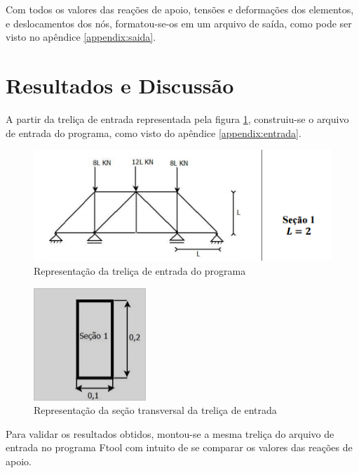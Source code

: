 \documentclass[paper=a4, fontsize=11pt]{scrartcl}
\begin{document}
Com todos os valores das reações de apoio, tensões e deformações dos elementos, e deslocamentos dos nós, formatou-se-os em um arquivo de saída, como pode ser visto no apêndice \ref{appendix:saida}.

\section{Resultados e Discussão}

A partir da treliça de entrada representada pela figura \ref{fig:trelica_entrada}, construiu-se o arquivo de entrada do programa, como visto do apêndice \ref{appendix:entrada}.

\begin{figure}[H]
  \includegraphics[width=\textwidth]{trelica_entrada.png}
  \caption{Representação da treliça de entrada do programa}
  \label{fig:trelica_entrada}
\end{figure}

\begin{figure}[H]
  \includegraphics[center]{secao1.png}
  \caption{Representação da seção transversal da treliça de entrada}
  \label{fig:secao14}
\end{figure}


Para validar os resultados obtidos, montou-se a mesma treliça do arquivo de entrada no programa Ftool com intuito de se comparar os valores das reações de apoio.
\end{document}
